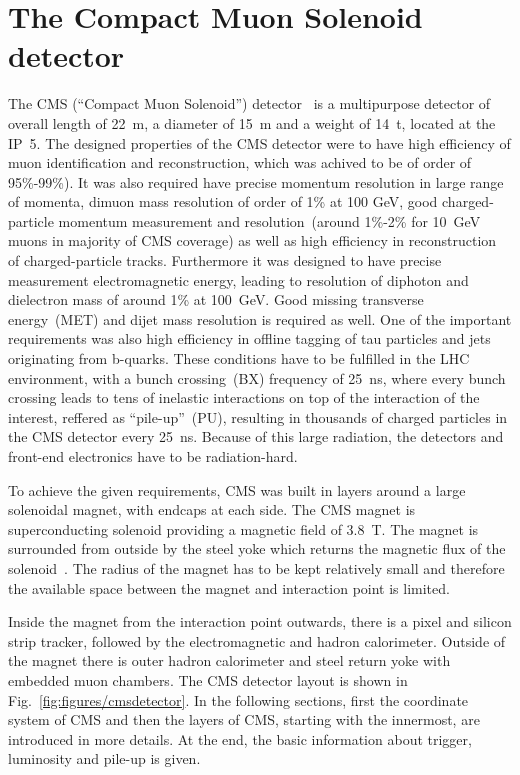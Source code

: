 \newpage

\section{The Compact Muon Solenoid detector~\label{sec:CMS}}

The CMS (``Compact Muon Solenoid'') detector~\cite{Chatrchyan:2008aa, CMSproposal} is a multipurpose detector of overall length of 22~m, a diameter of 15~m and a weight of 14~t, located at the IP~5. The designed properties of the CMS  detector were to have high efficiency of muon identification and reconstruction, which was achived to be of order of 95\%-99\%). It was also required have precise momentum resolution in large range of momenta, dimuon mass resolution of order of 1\% at 100 GeV, good charged-particle momentum measurement and resolution~(around 1\%-2\% for 10~GeV muons in majority of CMS coverage) as well as high efficiency in reconstruction of charged-particle tracks. Furthermore it was designed to have precise measurement electromagnetic energy, leading to resolution of diphoton and dielectron mass of around 1\% at 100~GeV. Good missing transverse energy~(MET) and dijet mass resolution is required as well. One of the important requirements was also high efficiency in offline tagging of tau particles and jets originating from b-quarks. These conditions have to be fulfilled in the LHC environment, with a bunch crossing~(BX) frequency of 25~ns, where every bunch crossing leads to tens of inelastic interactions on top of the interaction of the interest, reffered as ``pile-up''~(PU), resulting in thousands of charged particles in the CMS detector every 25~ns. Because of this large radiation, the detectors and front-end electronics have to be radiation-hard.

To achieve the given requirements, CMS was built in layers around a large solenoidal magnet, with endcaps at each side. The CMS magnet is superconducting solenoid providing a magnetic field of 3.8~T. The magnet is surrounded from outside by the steel yoke which returns the magnetic flux of the solenoid~\cite{tdrMagnet}. The radius of the magnet has to be kept relatively small and therefore the available space between the magnet and interaction point is limited.

Inside the magnet from the interaction point outwards, there is a pixel and silicon strip tracker, followed by the electromagnetic and hadron calorimeter. Outside of the magnet there is outer hadron calorimeter and steel return yoke with embedded muon chambers. The CMS detector layout is shown in Fig.~\ref{fig:figures/cmsdetector}. In the following sections, first the coordinate system of CMS and then the layers of CMS, starting with the innermost, are introduced in more details. At the end, the basic information about trigger, luminosity and pile-up is given.



